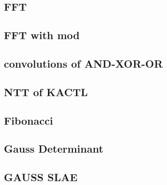\subsection{FFT}
\vspace{-2.2ex}
\raggedbottom
\vspace{-3.2ex}
\hrulefill
\subsection{FFT with mod}
\vspace{-2.2ex}
\raggedbottom
\vspace{-3.2ex}
\hrulefill
\subsection{convolutions of AND-XOR-OR}
\vspace{-2.2ex}
\raggedbottom
\vspace{-3.2ex}
\hrulefill
\subsection{NTT of KACTL}
\vspace{-2.2ex}
\raggedbottom
\vspace{-3.2ex}
\hrulefill
\subsection{Fibonacci}
\vspace{-2.2ex}
\raggedbottom
\vspace{-3.2ex}
\hrulefill
\subsection{Gauss Determinant}
\vspace{-2.2ex}
\raggedbottom
\vspace{-3.2ex}
\hrulefill
\subsection{GAUSS SLAE}
\vspace{-2.2ex}
\raggedbottom
\vspace{-3.2ex}
\hrulefill
